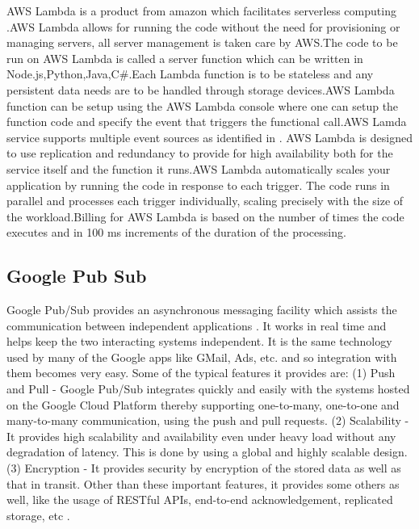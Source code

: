      AWS Lambda is a product from amazon which facilitates serverless
     computing \cite{www-awslambda}.AWS Lambda allows for running the
     code without the need for provisioning or managing servers, all
     server management is taken care by AWS.The code to be run on AWS
     Lambda is called a server function which can be written in
     Node.js,Python,Java,C\#.Each Lambda function is to be stateless
     and any persistent data needs are to be handled through storage
     devices.AWS Lambda function can be setup using the AWS Lambda
     console where one can setup the function code and specify the
     event that triggers the functional call.AWS Lamda service
     supports multiple event sources as identified in
     \cite{www-awslambdaevent}. AWS Lambda is designed to use
     replication and redundancy to provide for high availability both
     for the service itself and the function it runs.AWS Lambda
     automatically scales your application by running the code in
     response to each trigger. The code runs in parallel and processes
     each trigger individually, scaling precisely with the size of the
     workload.Billing for AWS Lambda is based on the number of times
     the code executes and in 100 ms increments of the duration of the
     processing.

\subsection{Google Pub Sub}

     Google Pub/Sub provides an asynchronous messaging facility which 
     assists the communication between independent applications 
     \cite{www-google-pub-sub}. It works in real time and helps
     keep the two interacting systems independent. It is the same
     technology used by many of the Google apps like GMail, Ads,
     etc. and so integration with them becomes very
     easy.  Some of the typical features it provides are: (1) Push 
     and Pull - Google Pub/Sub integrates quickly and easily with 
     the systems hosted on the Google Cloud Platform thereby supporting 
     one-to-many, one-to-one and many-to-many communication, using 
     the push and pull requests. (2) Scalability - It provides high 
     scalability and availability even under heavy load without any 
     degradation of latency. This is done by using a global and highly 
     scalable design. (3) Encryption - It provides security by encryption of
     the stored data as well as that in transit. Other than these
     important features, it provides some others as well, like the
     usage of RESTful APIs, end-to-end acknowledgement, replicated
     storage, etc \cite{www-google-pub-sub-features}.
     
